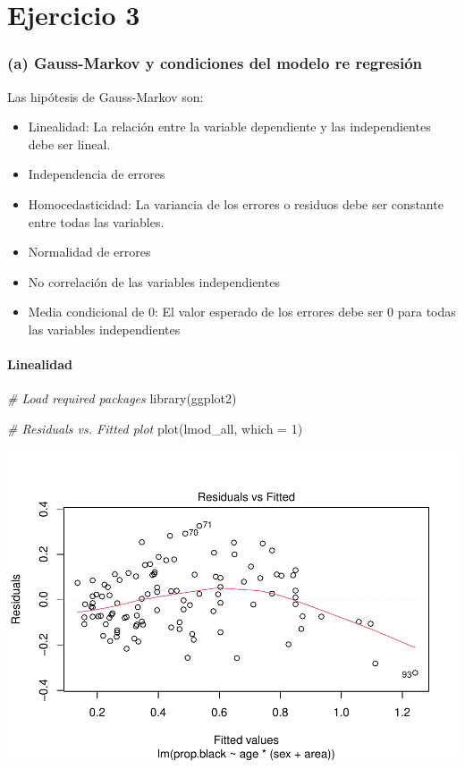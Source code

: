 \documentclass[
]{article}
\newenvironment{Shaded}{\begin{snugshade}}{\end{snugshade}}
\newcommand{\AttributeTok}[1]{\textcolor[rgb]{0.77,0.63,0.00}{#1}}
\newcommand{\CommentTok}[1]{\textcolor[rgb]{0.56,0.35,0.01}{\textit{#1}}}
\newcommand{\DecValTok}[1]{\textcolor[rgb]{0.00,0.00,0.81}{#1}}
\newcommand{\FunctionTok}[1]{\textcolor[rgb]{0.00,0.00,0.00}{#1}}
\newcommand{\NormalTok}[1]{#1}
\providecommand{\tightlist}{%
  \setlength{\itemsep}{0pt}\setlength{\parskip}{0pt}}
\begin{document}
\hypertarget{ejercicio-3}{%
\section{Ejercicio 3}\label{ejercicio-3}}

\hypertarget{a-gauss-markov-y-condiciones-del-modelo-re-regresiuxf3n}{%
\subsubsection{(a) Gauss-Markov y condiciones del modelo re
regresión}\label{a-gauss-markov-y-condiciones-del-modelo-re-regresiuxf3n}}

Las hipótesis de Gauss-Markov son:

\begin{itemize}
\tightlist
\item
  Linealidad: La relación entre la variable dependiente y las
  independientes debe ser lineal.
\item
  Independencia de errores
\item
  Homocedasticidad: La variancia de los errores o residuos debe ser
  constante entre todas las variables.
\item
  Normalidad de errores
\item
  No correlación de las variables independientes
\item
  Media condicional de 0: El valor esperado de los errores debe ser 0
  para todas las variables independientes
\end{itemize}

\hypertarget{linealidad}{%
\paragraph{Linealidad}\label{linealidad}}

\begin{Shaded}
\begin{Highlighting}[]
\CommentTok{\# Load required packages}
\FunctionTok{library}\NormalTok{(ggplot2)}

\CommentTok{\# Residuals vs. Fitted plot}
\FunctionTok{plot}\NormalTok{(lmod\_all, }\AttributeTok{which =} \DecValTok{1}\NormalTok{)}
\end{Highlighting}
\end{Shaded}

\includegraphics{code_files/figure-latex/unnamed-chunk-16-1.pdf}
\end{document}
